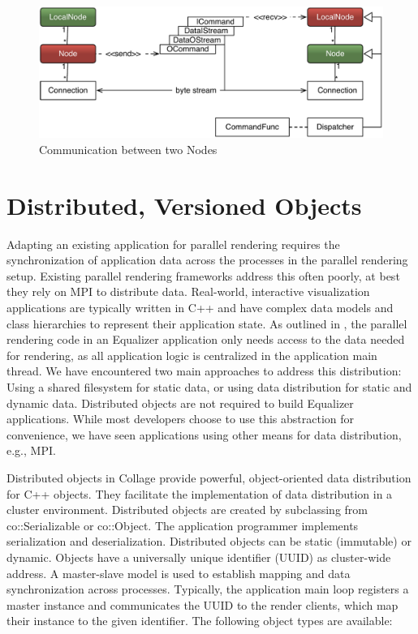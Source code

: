 \begin{figure}[h!t]\center
  \includegraphics[width=\textwidth]{images/netNode.pdf}
  {\caption{\label{fNetNode}Communication between two Nodes}}
\end{figure}

\section{Distributed, Versioned Objects}

Adapting an existing application for parallel rendering requires the
synchronization of application data across the processes in the parallel
rendering setup. Existing parallel rendering frameworks address this often
poorly, at best they rely on MPI to distribute data. Real-world, interactive
visualization applications are typically written in C++ and have complex data
models and class hierarchies to represent their application state. As outlined
in \cite{EMP:09}, the parallel rendering code in an \textsf{Equalizer}
application only needs access to the data needed for rendering, as all
application logic is centralized in the application main thread. We have
encountered two main approaches to address this distribution: Using a shared
filesystem for static data, or using data distribution for static and dynamic
data. Distributed objects are not required to build \textsf{Equalizer}
applications. While most developers choose to use this abstraction for
convenience, we have seen applications using other means for data distribution,
e.g., MPI.

Distributed objects in \textsf{Collage} provide powerful, object-oriented data
distribution for C++ objects. They facilitate the implementation of data
distribution in a cluster environment. Distributed objects are created by
subclassing from \textsf{co::Serializable} or \textsf{co::Object}. The
application programmer implements serialization and deserialization. Distributed
objects can be static (immutable) or dynamic. Objects have a universally unique
identifier (UUID) as cluster-wide address. A master-slave model is used to
establish mapping and data synchronization across processes. Typically, the
application main loop registers a master instance and communicates the UUID to
the render clients, which map their instance to the given identifier. The
following object types are available:

